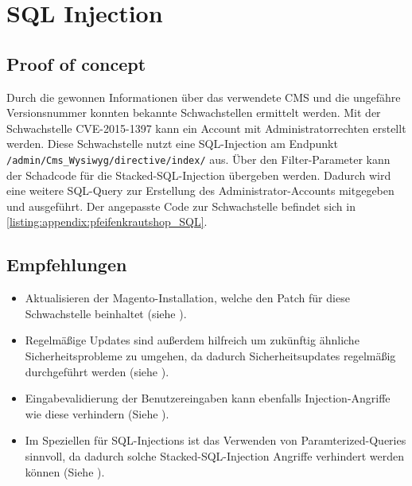 
\section{\makecvssbadge SQL Injection}

\subsection*{Proof of concept}
Durch die gewonnen Informationen über das verwendete CMS und die ungefähre Versionsnummer konnten bekannte Schwachstellen ermittelt werden. Mit der Schwachstelle CVE-2015-1397 kann ein Account mit Administratorrechten erstellt werden. Diese Schwachstelle nutzt eine SQL-Injection am Endpunkt \texttt{/admin/Cms\_Wysiwyg/directive/index/} aus. Über den Filter-Parameter kann der Schadcode für die Stacked-SQL-Injection übergeben werden. Dadurch wird eine weitere SQL-Query zur Erstellung des Administrator-Accounts mitgegeben und ausgeführt. Der angepasste Code zur Schwachstelle befindet sich in \autoref{listing:appendix:pfeifenkrautshop_SQL}.


\subsection*{Empfehlungen}
\begin{itemize}
    \item Aktualisieren der Magento-Installation, welche den Patch für diese Schwachstelle beinhaltet (siehe \cite{owaspVulnerableDependency}).
    \item Regelmäßige Updates sind außerdem hilfreich um zukünftig ähnliche Sicherheitsprobleme zu umgehen, da dadurch Sicherheitsupdates regelmäßig durchgeführt werden (siehe \cite{owaspVulnerableDependency}).
    \item Eingabevalidierung der Benutzereingaben kann ebenfalls Injection-Angriffe wie diese verhindern (Siehe \cite{owaspInputValidation}).
    \item Im Speziellen für SQL-Injections ist das Verwenden von Paramterized-Queries sinnvoll, da dadurch solche Stacked-SQL-Injection Angriffe verhindert werden können  (Siehe \cite{owaspSQLInjectionPrevention}).
\end{itemize}


